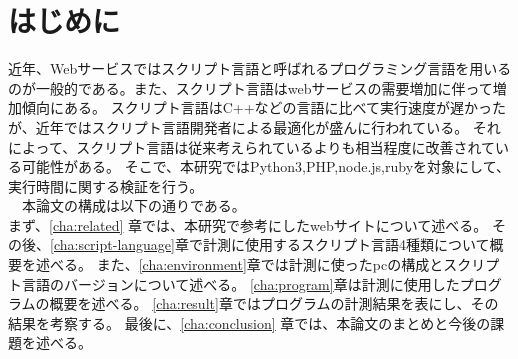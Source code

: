 \chapter{はじめに}
\label{cha:intro}
近年、Webサービスではスクリプト言語と呼ばれるプログラミング言語を用いるのが一般的である。また、スクリプト言語はwebサービスの需要増加に伴って増加傾向にある。
スクリプト言語はC++などの言語に比べて実行速度が遅かったが、近年ではスクリプト言語開発者による最適化が盛んに行われている。
それによって、スクリプト言語は従来考えられているよりも相当程度に改善されている可能性がある。
そこで、本研究ではPython3,PHP,node.js,rubyを対象にして、実行時間に関する検証を行う。\\
　本論文の構成は以下の通りである。\\
まず、\ref{cha:related} 章では、本研究で参考にしたwebサイトについて述べる。
その後、\ref{cha:script-language}章で計測に使用するスクリプト言語4種類について概要を述べる。
また、\ref{cha:environment}章では計測に使ったpcの構成とスクリプト言語のバージョンについて述べる。
\ref{cha:program}章は計測に使用したプログラムの概要を述べる。
\ref{cha:result}章ではプログラムの計測結果を表にし、その結果を考察する。
最後に、\ref{cha:conclusion} 章では、本論文のまとめと今後の課題を述べる。